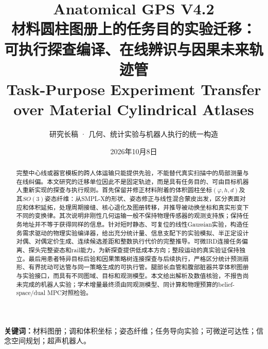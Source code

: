 \documentclass[11pt,a4paper]{article}
\numberwithin{equation}{section}
\theoremstyle{definition}
\begin{document}
\title{Anatomical GPS V4.2\\[2mm]
\Large 材料圆柱图册上的任务目的实验迁移：\\
可执行探查编译、在线辨识与因果未来轨迹管\\[3mm]
\large Task-Purpose Experiment Transfer over Material Cylindrical Atlases}
\author{研究长稿 · 几何、统计实验与机器人执行的统一构造}
\date{2026年10月8日}
\maketitle

\begin{abstract}
完整中心线或器官模板的跨人体运输只能提供先验，不能替代真实扫描中的局部测量与在线纠偏。本文研究的迁移单位因此不是固定轨迹，而是具有任务目的、可由目标机器人重新实现的探查与执行规则。首先保留并修正材料附着的体积圆柱坐标$(\varphi,h,d)$及其$SO(3)$姿态纤维：从SMPL-X的形状、姿态修正与线性混合蒙皮出发，区分表面对应和体积延拓，处理周期接缝、核心退化及图册转移，并推导被动换坐标和真实形变下不同的变换律。其次说明非刚性几何运输一般不保持物理传感器的观测支持族；保持任务地址并不等于获得同样的信息。针对短时静态、可复位的线性Gaussian实验，构造任务需求驱动的物理实验编译器，给出充分统计量、信息支配下的实验模拟、半正定设计对偶、对偶定价生成、连续候选差距和整数执行代价的完整推导。可微IRD连接任务偏离、探头完整姿态和rail能力，为新探查提供低成本方向；整段运动的真实验证保持独立。最后用患者特异目标后验和因果策略树连接探查与后续执行，严格区分统计预测扇形、有界扰动可达管与同一策略生成的可执行管。腿部长血管和腹部脏器共享体积图册与实验接口，而具有不同图域、目标和观测模型。本文给出解析及数值核验，不报告尚未完成的机器人实验；学术增量最终须由同观测模型、同计算和物理预算的belief-space/dual MPC对照检验。
\end{abstract}

\noindent\textbf{关键词：}材料图册；调和体积坐标；姿态纤维；任务导向实验；可微逆可达性；信念空间规划；超声机器人。

\begin{center}
\end{center}
\clearpage
\setcounter{tocdepth}{1}
\tableofcontents
\clearpage
\end{document}
